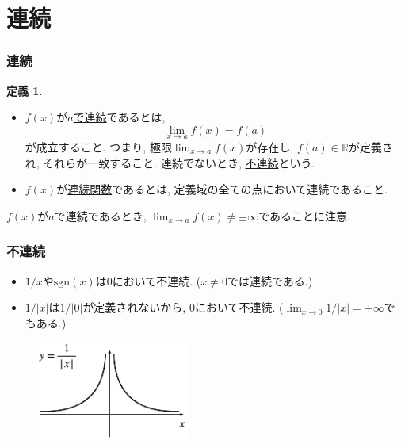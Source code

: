 \documentclass[dvipdfmx,cjk,10.2pt]{beamer}
\newcommand{\R}{\mathbb{R}}
\theoremstyle{definition}
\newtheorem{Def}[Thm]{定義}
\begin{document}

\section{連続}

\begin{frame}
\frametitle{連続} 


\begin{Def}
\begin{itemize}
\item $f(x)$が\underline{$a$で連続}であるとは, 
$$
\lim_{x\to a}f(x)=f(a)
$$
が成立すること. 
つまり, 極限$\displaystyle \lim_{x\to a}f(x)$が存在し, $f(a) \in \R$が定義され, それらが一致すること. 
連続でないとき, \underline{不連続}という. 
\item $f(x)$が\underline{連続関数}であるとは, 定義域の全ての点において連続であること. 
\end{itemize}
\end{Def}

$f(x)$が$a$で連続であるとき, $\displaystyle \lim_{x\to a}f(x) \neq \pm  \infty$であることに注意. 

\end{frame}





\begin{frame}
\frametitle{不連続} 



\begin{itemize}
\item  $1/x$や$\mathrm{sgn}(x)$は$0$において不連続. ($x\neq 0$では連続である.) 
\item $1/|x|$は$1/|0|$が定義されないから, $0$において不連続. ($\displaystyle \lim_{x\to 0}1/|x|=+\infty$でもある.)
\end{itemize}



 \begin{figure}[htbp]
 \begin{center} 
  \includegraphics[width=50mm]{xinv_abs.png}
 \end{center}
\end{figure}

\vspace{-1mm}


\end{frame}
\end{document}
